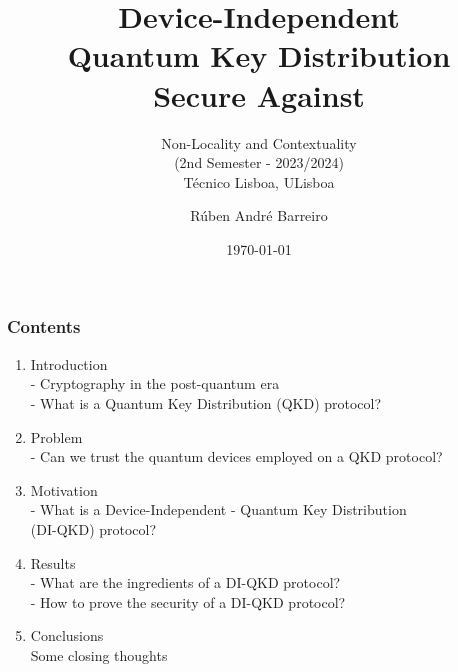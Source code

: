 \documentclass{beamer}
\title{{Device-Independent}\\{Quantum Key Distribution}\\{Secure Against}\\\vspace{0.25ex}{Collective Attacks}}
\subtitle{Non-Locality and Contextuality\\ (2nd Semester - 2023/2024)\\\vspace{-0.75ex} T\'{e}cnico Lisboa, ULisboa}
\author{R\'{u}ben Andr\'{e} Barreiro}
\date{\today}
\begin{document}
	\setcounter{showProgressBar}{0}
	\setcounter{showSlideNumbers}{0}

	\frame{\titlepage}

	\begin{frame}
		\frametitle{Contents}
		\begin{enumerate}
            \item Introduction \\ \textcolor{ExecusharesGrey}{\footnotesize\hspace{1em} - Cryptography in the post-quantum era\\\hspace{1em} - What is a Quantum Key Distribution (QKD) protocol?}
			\item Problem \\ \textcolor{ExecusharesGrey}{\footnotesize\hspace{1em} - Can we trust the quantum devices employed on a QKD protocol?}
			\item Motivation \\ \textcolor{ExecusharesGrey}{\footnotesize\hspace{1em} - What is a Device-Independent - Quantum Key Distribution\\\hspace{1.5em} (DI-QKD) protocol?}
			\item Results \\ \textcolor{ExecusharesGrey}{\footnotesize\hspace{1em} - What are the ingredients of a DI-QKD protocol?\\\hspace{1em} - How to prove the security of a DI-QKD protocol?}
			\item Conclusions \\ \textcolor{ExecusharesGrey}{\footnotesize\hspace{1em} Some closing thoughts}
		\end{enumerate}
	\end{frame}

	\setcounter{framenumber}{0}
	\setcounter{showProgressBar}{1}
	\setcounter{showSlideNumbers}{1}
\end{document}

